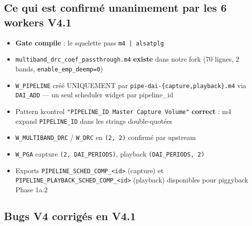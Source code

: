 \documentclass[11pt,a4paper]{article}
\begin{document}
\subsection{Ce qui est confirmé unanimement par les 6 workers V4.1}

\begin{itemize}[leftmargin=*, itemsep=1pt]
  \item \textbf{Gate compile} : le squelette pass \texttt{m4 | alsatplg}
  \item \texttt{multiband\_drc\_coef\_passthrough.m4} \textbf{existe} dans notre fork (70 lignes, 2 bands, \texttt{enable\_emp\_deemp=0})
  \item \texttt{W\_PIPELINE} créé UNIQUEMENT par \texttt{pipe-dai-\{capture,playback\}.m4} via \texttt{DAI\_ADD} --- un seul scheduler widget par pipeline\_id
  \item Pattern kcontrol \texttt{"PIPELINE\_ID Master Capture Volume"} \textbf{correct} : m4 expand \texttt{PIPELINE\_ID} dans les strings double-quotées
  \item \texttt{W\_MULTIBAND\_DRC} / \texttt{W\_DRC} en \texttt{(2, 2)} confirmé par upstream
  \item \texttt{W\_PGA} capture \texttt{(2, DAI\_PERIODS)}, playback \texttt{(DAI\_PERIODS, 2)}
  \item Exports \texttt{PIPELINE\_SCHED\_COMP\_<id>} (capture) et \texttt{PIPELINE\_PLAYBACK\_SCHED\_COMP\_<id>} (playback) disponibles pour piggyback Phase 1a.2
\end{itemize}

\subsection{Bugs V4 corrigés en V4.1}
\end{document}
